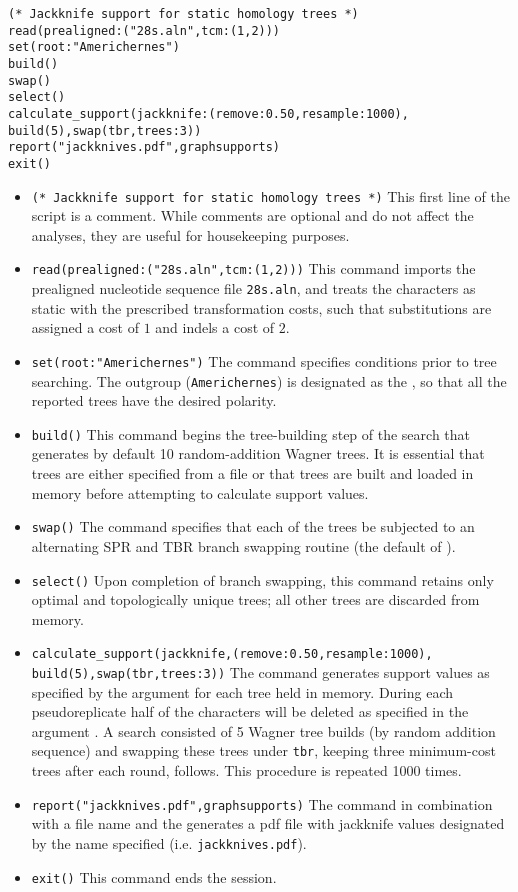 \begin{verbatim}
(* Jackknife support for static homology trees *)
read(prealigned:("28s.aln",tcm:(1,2)))
set(root:"Americhernes")
build()
swap()
select()
calculate_support(jackknife:(remove:0.50,resample:1000), 
build(5),swap(tbr,trees:3))
report("jackknives.pdf",graphsupports)
exit()
\end{verbatim}

\begin{itemize}
\item \texttt{(* Jackknife support for static homology trees *)} This first line of the script is a comment. While
 comments are optional and do not affect the analyses, they are useful for housekeeping purposes.
\item \texttt{read(prealigned:("28s.aln",tcm:(1,2)))} This command imports the prealigned nucleotide sequence 
file \texttt{28s.aln}, and treats the characters as static with the prescribed transformation costs, such that
substitutions are assigned a cost of $ 1 $ and indels a cost of $ 2$.
\item \texttt{set(root:"Americhernes")} The  command specifies conditions prior to tree 
searching. The outgroup (\texttt{Americhernes}) is designated as the , so that all the reported 
trees have the desired polarity.     
\item \texttt{build()} This command begins the tree-building step of the search that generates by default 10 
random-addition Wagner trees. It is essential that trees are either specified from a file or that trees are built and loaded in 
memory before attempting to calculate support values.
\item \texttt{swap()} The  command specifies that each of the trees be subjected to an 
alternating SPR and TBR branch swapping routine (the default of \poy).
\item \texttt{select()} Upon completion of branch swapping, this command retains only optimal and topologically 
unique trees; all other trees are discarded from memory. 
\item \texttt{calculate\_support(jackknife,(remove:0.50,resample:1000),\\ build(5),swap(tbr,trees:3))} 
The  command generates support values as specified by the 
 argument for each tree held in 
memory. During each pseudoreplicate half of the characters will be deleted as specified in the argument
. A search consisted of 5 Wagner tree builds (by random addition sequence) 
and swapping these trees under \texttt{tbr}, keeping three minimum-cost trees
after each round, follows.  This procedure is repeated 1000 times.
\item \texttt{report("jackknives.pdf",graphsupports)}  The  command in combination with 
a file name and the  generates a pdf file with jackknife values designated by the 
name specified (i.e. \texttt{jackknives.pdf}). 
\item \texttt{exit()} This command ends the \poy session.
\end{itemize}

